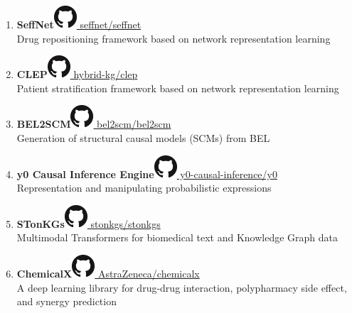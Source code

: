\documentclass[10pt,a4paper,sans]{moderncv} %
\begin{document}
\begin{enumerate}
        \item \textbf{SeffNet}\hfill\href{https://github.com/seffnet/seffnet}{\includegraphics[scale=0.25]{img/GitHub-Mark-32px} seffnet/seffnet}
\\
    Drug repositioning framework based on network representation learning

        \item \textbf{CLEP}\hfill\href{https://github.com/hybrid-kg/clep}{\includegraphics[scale=0.25]{img/GitHub-Mark-32px} hybrid-kg/clep}
\\
    Patient stratification framework based on network representation learning

        \item \textbf{BEL2SCM}\hfill\href{https://github.com/bel2scm/bel2scm}{\includegraphics[scale=0.25]{img/GitHub-Mark-32px} bel2scm/bel2scm}
\\
    Generation of structural causal models (SCMs) from BEL

        \item \textbf{y0 Causal Inference Engine}\hfill\href{https://github.com/y0-causal-inference/y0}{\includegraphics[scale=0.25]{img/GitHub-Mark-32px} y0-causal-inference/y0}
\\
    Representation and manipulating probabilistic expressions

        \item \textbf{STonKGs}\hfill\href{https://github.com/stonkgs/stonkgs}{\includegraphics[scale=0.25]{img/GitHub-Mark-32px} stonkgs/stonkgs}
\\
    Multimodal Transformers for biomedical text and Knowledge Graph data

        \item \textbf{ChemicalX}\hfill\href{https://github.com/AstraZeneca/chemicalx}{\includegraphics[scale=0.25]{img/GitHub-Mark-32px} AstraZeneca/chemicalx}
\\
    A deep learning library for drug-drug interaction, polypharmacy side effect, and synergy prediction


\end{enumerate}
\end{document}
